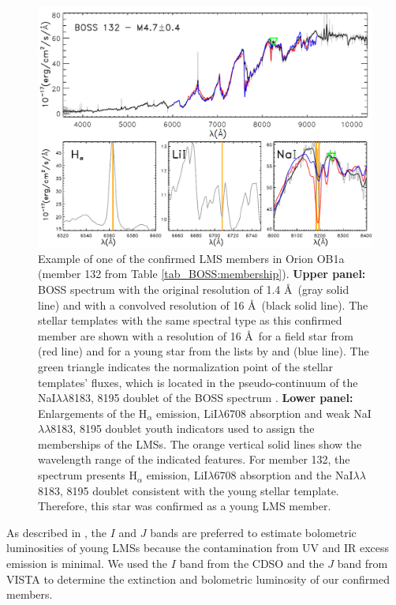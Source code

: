 \documentclass[12pt]{article}
\newcounter{subsubsubsection}[subsubsection]
\begin{document}
\begin{figure}[ht!]%
	\centering \includegraphics[width=1.\textwidth]{f5.pdf}
	\caption[Membership criteria for M-type stars]{Example of one of the confirmed LMS members in Orion OB1a (member 132 from Table \ref{tab_BOSS:membership}). \textbf {Upper panel:} BOSS spectrum with the original resolution of 1.4 \AA\ (gray solid line) and with a convolved resolution of 16 \AA\ (black solid line). The stellar templates with the same spectral type as this confirmed member are shown with a resolution of 16 \AA\ for a field star from \citet{Kirkpatrick1999} (red line) and for a young star from the lists by \citet{Luhman2000,Briceno2002,Luhman2003b} and \citet{Luhman2004} (blue line). The green triangle indicates the normalization point of the stellar templates' fluxes, which is located in the pseudo-continuum of the NaI$\lambda\lambda$8183, 8195 doublet of the BOSS spectrum \citep{Schlieder2012}. \textbf {Lower panel:} Enlargements of the H$_\alpha$ emission, LiI$\lambda$6708 absorption and weak NaI$\lambda\lambda$8183, 8195 doublet youth indicators used to assign the memberships of the LMSs. The orange vertical solid lines show the wavelength range of the indicated features. For member 132, the spectrum presents H$_\alpha$ emission, LiI$\lambda$6708 absorption and the NaI$\lambda\lambda$8183, 8195 doublet consistent with the young stellar template. Therefore, this star was confirmed as a young LMS member.}
	\label{fig_BOSS:membership}
\end{figure}

\label{sec_BOSS:parameters}

As described in \citet{Luhman1999}, the $I$ and $J$ bands are preferred to estimate bolometric luminosities of young LMSs because the contamination from UV and IR excess emission is minimal. We used the $I$ band from the CDSO and the $J$ band from VISTA to determine the extinction and bolometric luminosity of our confirmed members.
\end{document}
